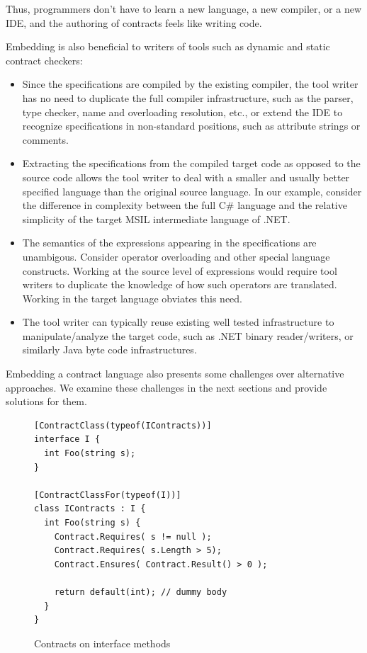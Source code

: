 \documentclass{sig-alternate}
\newcommand{\csharp}{C\#}
\begin{document}
\noindent Thus, programmers don't have to learn a new language, a new compiler,
or a new IDE, and the authoring of contracts feels like writing code.


Embedding is also beneficial to writers of tools such as dynamic and
static contract checkers:
\begin{itemize}
  \item Since the specifications are compiled by the existing
    compiler, the tool writer has no need to duplicate the full
    compiler infrastructure, such as the parser, type
    checker, name and overloading resolution, etc., or extend the IDE
    to recognize specifications in non-standard positions, such as
    attribute strings or comments.

  \item Extracting the specifications from the compiled target code as
    opposed to the source code allows the tool writer to deal with a
    smaller and usually better specified language than the original
    source language. In our example, consider the difference in
    complexity between the full \csharp{} language and the relative
    simplicity of the target MSIL intermediate language of .NET.
    
  \item The semantics of the expressions appearing in the
    specifications are unambigous. Consider operator overloading and
    other special language constructs. Working at the source level of
    expressions would require tool writers to duplicate the knowledge
    of how such operators are translated. Working in the target
    language obviates this need.

  \item The tool writer can typically reuse existing well tested
    infrastructure to manipulate/analyze the target code, such as .NET
    binary reader/writers, or similarly Java byte code
    infrastructures.
\end{itemize}

\noindent Embedding a contract language also presents some challenges over
alternative approaches. We examine these challenges in the next sections and
provide solutions for them.

\begin{figure}[tb!]
\begin{center}
\begin{lstlisting}
[ContractClass(typeof(IContracts))]
interface I {
  int Foo(string s);
}

[ContractClassFor(typeof(I))]
class IContracts : I {
  int Foo(string s) {
    Contract.Requires( s != null );
    Contract.Requires( s.Length > 5);
    Contract.Ensures( Contract.Result() > 0 );

    return default(int); // dummy body
  }
}
\end{lstlisting}
\end{center}
\vspace*{-5mm}
\caption{Contracts on interface methods}
\label{fig:interfacecontracts}
\vspace*{-3mm}
\end{figure}
\end{document}
